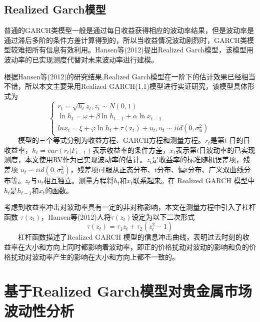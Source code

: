 \documentclass[UTF8,a4paper,12pt]{ctexart}  %
\begin{document}
\hypertarget{realized-garch-2}{%
\subsection{Realized Garch模型}\label{realized-garch-2}}

普通的GARCH类模型一般是通过每日收益获得相应的波动率结果，但是波动率是通过滞后多阶的条件方差计算得到的，所以当收益情况波动剧烈时，GARCH类模型较难把所有信息有效利用。Hansen等(2012)提出Realized Garch模型，该模型用波动率的已实现测度代替对未来波动率进行建模\citep{Hansen2012}。

根据Hansen等(2012)的研究结果,Realized Garch模型在一阶下的估计效果已经相当不错，所以本文主要采用Realized GARCH(1,1)模型进行实证研究，该模型具体形式为
\protect\hypertarget{eq:rg1}{}{\begin{equation}
\begin{cases}
r_{t}=\sqrt{h_{t}} z_{t},z_t\sim N(0,1)\\
\ln h_{t}=\omega+\beta \ln h_{t-1}+\alpha \ln x_{t-1}\\
ln x_{t}=\xi+\varphi \ln h_{t}+\tau\left(\mathrm{z}_{t}\right)+u_{t},u_{t} \sim iid  \left(0, \sigma_{u}^{2}\right)
\end{cases}
\label{eq:rg1}\end{equation}}
  模型的三个等式分别为收益方程、GARCH方程和测量方程。\(r_t\)是第\(t\)
日的日收益率，\(h_t=var(r_t|F_{t-1})\)表示收益率的条件方差，\(x_t\)表示第\(t\)日波动率的已实现测度，本文使用RV作为已实现波动率的估计。\(z_t\)是收益率的标准随机误差项，残差项 \(u_{t} \sim iid\left(0, \sigma_{u}^{2}\right)\)，残差项可服从正态分布、t分布、偏t分布、广义双曲线分布等。\(z_t\)与\(u_{t}\)相互独立。测量方程将\(h_t\)和\(x_t\)联系起来。在
Realized GARCH 模型中\(h_t\)是\(h_{t-1}\)和\(x_t\)的函数。

考虑到收益率冲击对波动率具有一定的非对称影响，本文在测量方程中引入了杠杆函数
\(\tau(z_t)\)，Hansen等(2012)人将\(\tau(z_t)\)设定为以下二次形式\protect\hypertarget{eq:tau}{}{\begin{equation}\tau(z_t)=\tau_1z_t+\tau_2(z_t^2-1)\label{eq:tau}\end{equation}}
  杠杆函数描述了Realized GARCH 模型的信息冲击曲线，表明过去时刻的收益率在大小和方向上同时都影响着波动率，即正的价格扰动对波动的影响和负的价格扰动对波动率产生的影响在大小和方向上都不一致的。

\hypertarget{realized-garch-3}{%
\section{基于Realized Garch模型对贵金属市场波动性分析}\label{realized-garch-3}}
\end{document}
